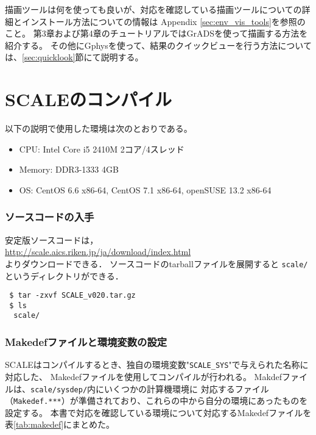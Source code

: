 描画ツールは何を使っても良いが、対応を確認している描画ツールについての詳細とインストール方法についての情報は
Appendix \ref{sec:env_vis_tools}を参照のこと。
第3章および第4章のチュートリアルではGrADSを使って描画する方法を紹介する。
その他にGphysを使って、結果のクイックビューを行う方法については、\ref{sec:quicklook}節にて説明する。



\section{SCALEのコンパイル} \label{sec:source_code}


以下の説明で使用した環境は次のとおりである。
\begin{itemize}
\item CPU: Intel Core i5 2410M 2コア/4スレッド
\item Memory: DDR3-1333 4GB
\item OS: CentOS 6.6 x86-64, CentOS 7.1 x86-64, openSUSE 13.2 x86-64
\end{itemize}

\subsubsection{ソースコードの入手}
安定版ソースコードは，\\
 \url{http://scale.aics.riken.jp/ja/download/index.html}\\
よりダウンロードできる．
ソースコードのtarballファイルを展開すると
\verb|scale/|というディレクトリができる．
\begin{verbatim}
 $ tar -zxvf SCALE_v020.tar.gz
 $ ls
  scale/
\end{verbatim}



\subsubsection{Makedefファイルと環境変数の設定}

SCALEはコンパイルするとき、独自の環境変数"\verb|SCALE_SYS|"で与えられた名称に対応した、
Makedefファイルを使用してコンパイルが行われる。
Makdefファイルは、\verb|scale/sysdep/|内にいくつかの計算機環境に
対応するファイル（\verb|Makedef.***|）が準備されており、これらの中から自分の環境にあったものを設定する。
本書で対応を確認している環境について対応するMakedefファイルを表\ref{tab:makedef}にまとめた。

